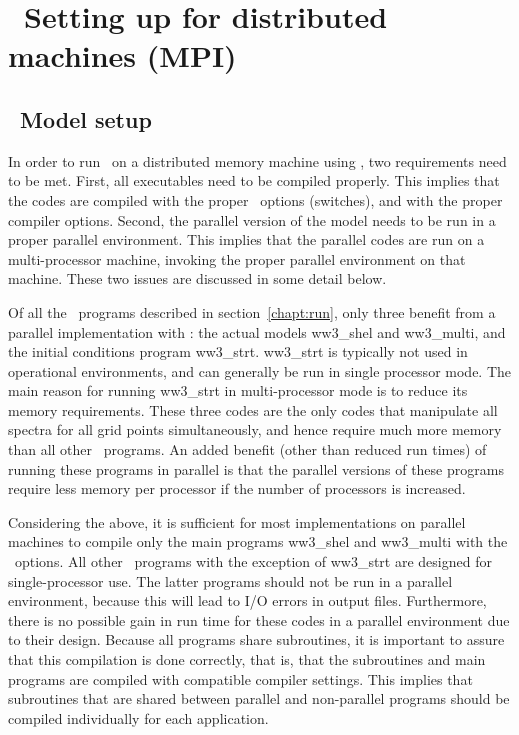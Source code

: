 \pagestyle{myheadings} \setcounter{page}{1} \setcounter{footnote}{0}

\section{~Setting up for distributed machines (MPI)} \label{app:mpi}
\newcounters 
\vssub
\subsection{~Model setup}
\vssub

In order to run \ws\ on a distributed memory machine using \mpi, two
requirements need to be met. First, all executables need to be compiled
properly. This implies that the codes are compiled with the proper \ws\
options (switches), and with the proper compiler options. Second, the parallel
version of the model needs to be run in a proper parallel environment. This
implies that the parallel codes are run on a multi-processor machine, invoking
the proper parallel environment on that machine. These two issues are
discussed in some detail below.

Of all the \ws\ programs described in section~\ref{chapt:run}, only three
benefit from a parallel implementation with \mpi: the actual models {\file
ww3\_shel} and {\file ww3\_multi}, and the initial conditions program {\file
ww3\_strt}. {\file ww3\_strt} is typically not used in operational
environments, and can generally be run in single processor mode. The main
reason for running {\file ww3\_strt} in multi-processor mode is to reduce its
memory requirements. These three codes are the only codes that manipulate all
spectra for all grid points simultaneously, and hence require much more memory
than all other \ws\ programs. An added benefit (other than reduced run times)
of running these programs in parallel is that the parallel versions of these
programs require less memory per processor if the number of processors is
increased.

Considering the above, it is sufficient for most implementations on parallel
machines to compile only the main programs {\file ww3\_shel} and {\file
ww3\_multi} with the \mpi\ options. All other \ws\ programs with the exception
of {\file ww3\_strt} are designed for single-processor use. The latter
programs should not be run in a parallel environment, because this will lead
to I/O errors in output files. Furthermore, there is no possible gain in run
time for these codes in a parallel environment due to their design. Because
all programs share subroutines, it is important to assure that this
compilation is done correctly, that is, that the subroutines and main programs
are compiled with compatible compiler settings. This implies that subroutines
that are shared between parallel and non-parallel programs should be compiled
individually for each application.


